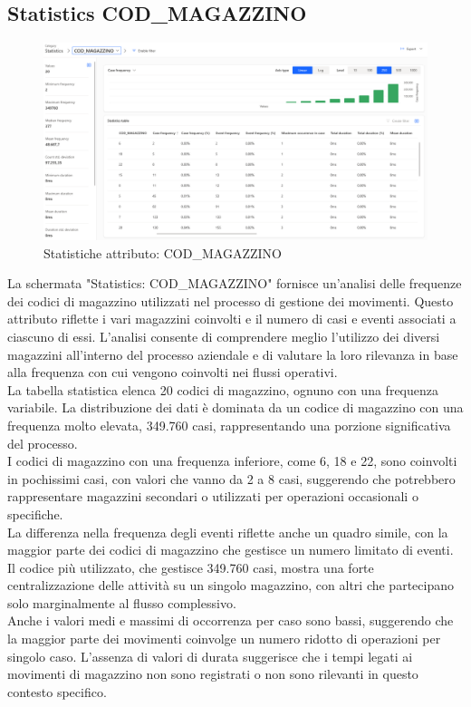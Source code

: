\documentclass{article}
\begin{document}
\subsection{Statistics COD\_MAGAZZINO}
\begin{figure}[H]
    \centering
    \includegraphics[width=\textwidth]{imgMicrosoft/DatiReali/StatisticsCODMAGAZZINODatiReali.png}
    \caption{Statistiche attributo: COD\_MAGAZZINO}
    \label{fig:statistics-COD-MAGAZZINO}
\end{figure}
La schermata "Statistics: COD\_MAGAZZINO" fornisce un'analisi delle frequenze dei codici di magazzino utilizzati nel processo di gestione dei movimenti. Questo attributo riflette i vari magazzini coinvolti e il numero di casi e eventi associati a ciascuno di essi. L'analisi consente di comprendere meglio l'utilizzo dei diversi magazzini all'interno del processo aziendale e di valutare la loro rilevanza in base alla frequenza con cui vengono coinvolti nei flussi operativi.\\
La tabella statistica elenca 20 codici di magazzino, ognuno con una frequenza variabile. La distribuzione dei dati è dominata da un codice di magazzino con una frequenza molto elevata, 349.760 casi, rappresentando una porzione significativa del processo.\\
I codici di magazzino con una frequenza inferiore, come 6, 18 e 22, sono coinvolti in pochissimi casi, con valori che vanno da 2 a 8 casi, suggerendo che potrebbero rappresentare magazzini secondari o utilizzati per operazioni occasionali o specifiche.\\
La differenza nella frequenza degli eventi riflette anche un quadro simile, con la maggior parte dei codici di magazzino che gestisce un numero limitato di eventi. Il codice più utilizzato, che gestisce 349.760 casi, mostra una forte centralizzazione delle attività su un singolo magazzino, con altri che partecipano solo marginalmente al flusso complessivo.\\
Anche i valori medi e massimi di occorrenza per caso sono bassi, suggerendo che la maggior parte dei movimenti coinvolge un numero ridotto di operazioni per singolo caso. L'assenza di valori di durata suggerisce che i tempi legati ai movimenti di magazzino non sono registrati o non sono rilevanti in questo contesto specifico.\\
\end{document}
